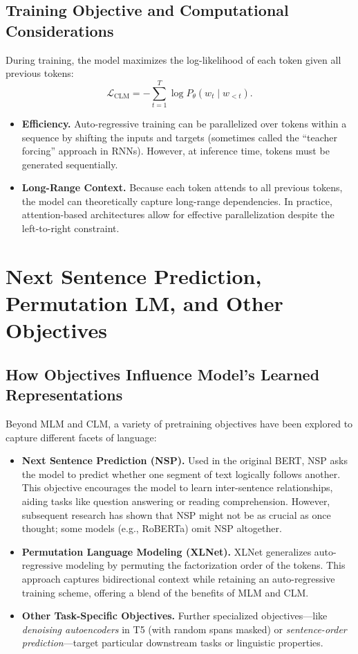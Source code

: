 \subsection{Training Objective and Computational Considerations}
\noindent
During training, the model maximizes the log-likelihood of each token given all previous tokens:
\[
\mathcal{L}_\text{CLM} = - \sum_{t=1}^{T} \log P_{\theta}(w_t \mid w_{<t}).
\]
\begin{itemize}
    \item \textbf{Efficiency.}
    Auto-regressive training can be parallelized over tokens within a sequence by shifting the inputs and targets (sometimes called the “teacher forcing” approach in RNNs). However, at inference time, tokens must be generated sequentially.
    \item \textbf{Long-Range Context.}
    Because each token attends to all previous tokens, the model can theoretically capture long-range dependencies. In practice, attention-based architectures allow for effective parallelization despite the left-to-right constraint.
\end{itemize}


\section{Next Sentence Prediction, Permutation LM, and Other Objectives}
\label{sec:other_obj}

\subsection{How Objectives Influence Model’s Learned Representations}
\noindent
Beyond MLM and CLM, a variety of pretraining objectives have been explored to capture different facets of language:

\begin{itemize}
    \item \textbf{Next Sentence Prediction (NSP).}
    Used in the original BERT, NSP asks the model to predict whether one segment of text logically follows another. This objective encourages the model to learn inter-sentence relationships, aiding tasks like question answering or reading comprehension. However, subsequent research has shown that NSP might not be as crucial as once thought; some models (e.g., RoBERTa) omit NSP altogether.

    \item \textbf{Permutation Language Modeling (XLNet).}
    XLNet generalizes auto-regressive modeling by permuting the factorization order of the tokens. This approach captures bidirectional context while retaining an auto-regressive training scheme, offering a blend of the benefits of MLM and CLM.

    \item \textbf{Other Task-Specific Objectives.}
    Further specialized objectives—like \emph{denoising autoencoders} in T5 (with random spans masked) or \emph{sentence-order prediction}—target particular downstream tasks or linguistic properties.

\end{itemize}

